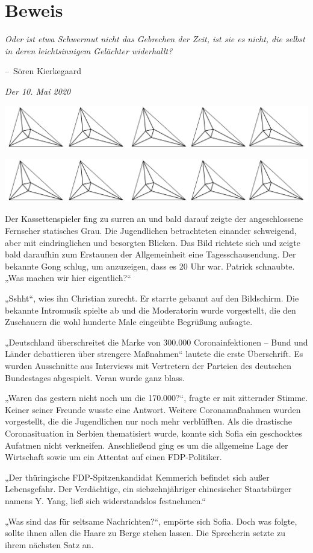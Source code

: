 \documentclass[oneside]{memoir}
\makeatletter
\newcommand{\parasep}{
\bigskip
\bigskip
\begin{center} 
   \includegraphics[scale=.08]{parasep5.jpg} 
\end{center}
\bigskip
\bigskip
}
\newenvironment{chapquote}[2][2em]
  {\setlength{\@tempdima}{#1}%
   \def\chapquote@author{#2}%
   \parshape 1 \@tempdima \dimexpr\textwidth-2\@tempdima\relax%
   \itshape}
  {\par\normalfont\hfill--\ \chapquote@author\hspace*{\@tempdima}\par\bigskip}
\makeatother
\begin{document}
\chapter{Beweis} %
\begin{chapquote}{Sören Kierkegaard}
\glqq Oder ist etwa Schwermut nicht das Gebrechen der Zeit, ist sie es nicht, die selbst in deren leichtsinnigem Gelächter widerhallt?\grqq
\end{chapquote}

\textit{Der 10. Mai 2020}


     
\parasep

     
\parasep

Der Kassettenspieler fing zu surren an und bald darauf zeigte der angeschlossene Fernseher statisches Grau. Die Jugendlichen betrachteten einander schweigend, aber mit eindringlichen und besorgten Blicken. Das Bild richtete sich und zeigte bald daraufhin zum Erstaunen der Allgemeinheit eine Tagesschausendung. Der bekannte Gong schlug, um anzuzeigen, dass es 20 Uhr war. Patrick schnaubte.
„Was machen wir hier eigentlich?“

„Sshht“, wies ihn Christian zurecht. Er starrte gebannt auf den Bildschirm. Die bekannte Intromusik spielte ab und die Moderatorin wurde vorgestellt, die den Zuschauern die wohl hunderte Male eingeübte Begrüßung aufsagte.

„Deutschland überschreitet die Marke von 300.000 Coronainfektionen – Bund und Länder debattieren über strengere Maßnahmen“ lautete die erste Überschrift. Es wurden Ausschnitte aus Interviews mit Vertretern der Parteien des deutschen Bundestages abgespielt. Veran wurde ganz blass.

„Waren das gestern nicht noch um die 170.000?“, fragte er mit zitternder Stimme. Keiner seiner Freunde wusste eine Antwort. Weitere Coronamaßnahmen wurden vorgestellt, die die Jugendlichen nur noch mehr verblüfften. Als die drastische Coronasituation in Serbien thematisiert wurde, konnte sich Sofia ein geschocktes Aufatmen nicht verkneifen. Anschließend ging es um die allgemeine Lage der Wirtschaft sowie um ein Attentat auf einen FDP-Politiker.

„Der thüringische FDP-Spitzenkandidat Kemmerich befindet sich außer Lebensgefahr. Der Verdächtige, ein siebzehnjähriger chinesischer Staatsbürger namens Y. Yang, ließ sich widerstandslos festnehmen.“

„Was sind das für seltsame Nachrichten?“, empörte sich Sofia. Doch was folgte, sollte ihnen allen die Haare zu Berge stehen lassen. Die Sprecherin setzte zu ihrem nächsten Satz an.
\end{document}

